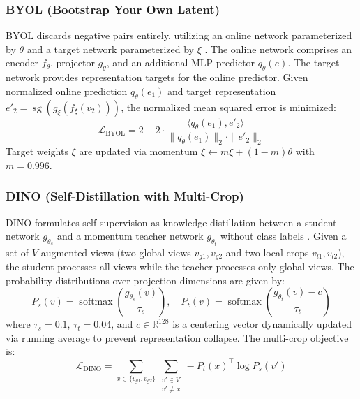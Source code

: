 \documentclass[journal,article,submit,moreauthors,pdftex]{Definitions/tsp}
\begin{document}
\subsubsection{BYOL (Bootstrap Your Own Latent)}
BYOL discards negative pairs entirely, utilizing an online network parameterized by $\theta$ and a target network parameterized by $\xi$ \cite{Grill20}. The online network comprises an encoder $f_\theta$, projector $g_\theta$, and an additional MLP predictor $q_\theta(e)$. The target network provides representation targets for the online predictor. Given normalized online prediction $q_\theta(e_1)$ and target representation $e'_2 = \operatorname{sg}(g_\xi(f_\xi(v_2)))$, the normalized mean squared error is minimized:
\begin{equation}
\mathcal{L}_{\text{BYOL}} = 2 - 2 \cdot \frac{\langle q_\theta(e_1), e'_2 \rangle}{\|q_\theta(e_1)\|_2 \cdot \|e'_2\|_2}
\end{equation}
Target weights $\xi$ are updated via momentum $\xi \leftarrow m \xi + (1-m) \theta$ with $m=0.996$.

\subsubsection{DINO (Self-Distillation with Multi-Crop)}
DINO formulates self-supervision as knowledge distillation between a student network $g_{\theta_s}$ and a momentum teacher network $g_{\theta_t}$ without class labels \cite{Caron21}. Given a set of $V$ augmented views (two global views $v_{g1}, v_{g2}$ and two local crops $v_{l1}, v_{l2}$), the student processes all views while the teacher processes only global views. The probability distributions over projection dimensions are given by:
\begin{equation}
P_s(v) = \operatorname{softmax}\left(\frac{g_{\theta_s}(v)}{\tau_s}\right), \quad P_t(v) = \operatorname{softmax}\left(\frac{g_{\theta_t}(v) - c}{\tau_t}\right)
\end{equation}
where $\tau_s = 0.1$, $\tau_t = 0.04$, and $c \in \mathbb{R}^{128}$ is a centering vector dynamically updated via running average to prevent representation collapse. The multi-crop objective is:
\begin{equation}
\mathcal{L}_{\text{DINO}} = \sum_{x \in \{v_{g1}, v_{g2}\}} \sum_{\substack{v' \in V \\ v' \neq x}} - P_t(x)^\top \log P_s(v')
\end{equation}
\end{document}
